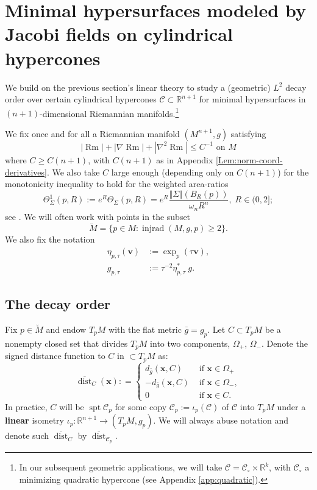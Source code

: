 \documentclass[11pt, letterpaper, reqno]{amsart}
\numberwithin{equation}{section}
\theoremstyle{remark}
\newcommand{\RR}{\mathbb{R}}
\newcommand{\cC}{\mathcal{C}}
\newcommand{\mbfv}{\mathbf{v}}
\newcommand{\mbfx}{\mathbf{x}}
\newcommand{\spt}{\operatorname{spt}}
\newcommand{\injrad}{\operatorname{injrad}}
\newcommand{\dist}{\operatorname{dist}}
\newcommand{\Rm}{\operatorname{Rm}}
\newcommand{\Sdist}{\overline{\dist}}
\begin{document}

\section{Minimal hypersurfaces modeled by Jacobi fields on cylindrical hypercones} \label{sec:nonlinear}

We build on the previous section's linear theory to study a (geometric) $L^2$ decay order over certain cylindrical hypercones $\cC \subset \RR^{n+1}$ for minimal hypersurfaces in $(n+1)$-dimensional Riemannian manifolds.\footnote{In our subsequent geometric applications, we will take $\cC = \cC_\circ \times \RR^k$, with $\cC_\circ$ a minimizing quadratic hypercone (see Appendix \ref{app:quadratic}).}

We fix once and for all a Riemannian manifold $(M^{n+1},g)$ satisfying
\[
|\Rm| + |\nabla \Rm| + |\nabla^2\Rm| \leq C^{-1} \text{ on } M
\]
where $C \geq C(n+1)$, with $C(n+1)$ as in Appendix \ref{Lem:norm-coord-derivatives}. We also take $C$ large enough (depending only on $C(n+1)$) for the monotonicity inequality to hold for the weighted area-ratios 
\[ \Theta^{1}_\Sigma(p, R) := e^{R} \Theta_\Sigma(p, R) = e^R \frac{\Vert \Sigma \Vert(B_R(p))}{\omega_n R^n}, \; R \in (0, 2]; \]
see \cite[\S 17]{Simon:GMT}. We will often work with points in the subset 
\[
	\breve M = \{ p \in M : \injrad(M, g, p) \geq 2 \}.
\]
We also fix the notation
\begin{align*}
	\eta_{p,\tau}(\mbfv) & := \exp_{p}(\tau \mbfv),\\
	g_{p,\tau} & := \tau^{-2} \eta_{p,\tau}^* \; g.
\end{align*}

\subsection{The decay order}

Fix $p \in \breve M$ and endow $T_p M$ with the flat metric $\bar g = g_p$. Let $C \subset T_p M$ be a nonempty closed set that divides $T_p M$ into two components, $\Omega_+$, $\Omega_-$. Denote the signed distance function to $C$ in $\subset T_p M$ as:
\begin{equation}\label{eq:Sdist-signed}
\Sdist_C(\mbfx) : = \begin{cases} d_{\bar g}(\mbfx, C) &  \text{ if } \mbfx \in \Omega_+ \\ - d_{\bar g}(\mbfx, C) & \text{ if } \mbfx \in \Omega_-, \\ 0 & \text { if } \mbfx \in C.  \end{cases}
\end{equation}
In practice, $C$ will be $\spt \cC_p$ for some copy $\cC_p := \iota_p(\cC)$ of $\cC$ into $T_p M$ under a \textbf{linear} isometry $\iota_p : \RR^{n+1} \to (T_p M, g_p)$. We will always abuse notation and denote such $\Sdist_C$ by $\Sdist_{\cC_p}$.
\end{document}
